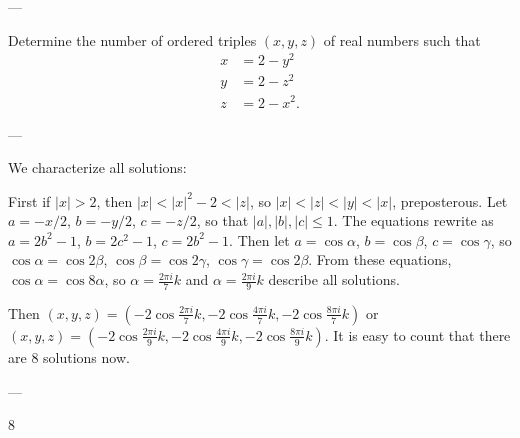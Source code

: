 
---

Determine the number of ordered triples $(x,y,z)$ of real numbers such that
\begin{align*}
    x&=2-y^2\\
    y&=2-z^2\\
    z&=2-x^2.
\end{align*}

---

We characterize all solutions:

First if $|x|>2$, then $|x|<|x|^2-2<|z|$, so $|x|<|z|<|y|<|x|$, preposterous. Let $a=-x/2$, $b=-y/2$, $c=-z/2$, so that $|a|,|b|,|c|\le1$. The equations rewrite as $a=2b^2-1$, $b=2c^2-1$, $c=2b^2-1$. Then let $a=\cos\alpha$, $b=\cos\beta$, $c=\cos\gamma$, so $\cos\alpha=\cos2\beta$, $\cos\beta=\cos2\gamma$, $\cos\gamma=\cos2\beta$. From these equations, $\cos\alpha=\cos8\alpha$, so $\alpha=\tfrac{2\pi i}7k$ and $\alpha=\tfrac{2\pi i}9k$ describe all solutions.

Then $(x,y,z)=(-2\cos\tfrac{2\pi i}7k,-2\cos\tfrac{4\pi i}7k,-2\cos\tfrac{8\pi i}7k)$ or $(x,y,z)=(-2\cos\tfrac{2\pi i}9k,-2\cos\tfrac{4\pi i}9k,-2\cos\tfrac{8\pi i}9k)$. It is easy to count that there are $8$ solutions now.

---

8
